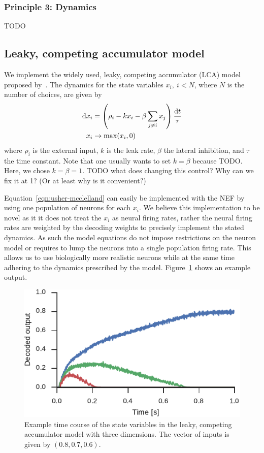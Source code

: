 \documentclass[10pt,letterpaper]{article}
\begin{document}
\subsubsection{Principle 3: Dynamics}
TODO

\subsection{Leaky, competing accumulator model}
We implement the widely used, leaky, competing accumulator (LCA) model proposed 
by~.  The dynamics for the state variables $x_i,\ i < N$, where 
$N$ is the number of choices, are given by
\begin{equation}\label{eqn:usher-mcclelland}
    \begin{split}
        \dif x_i &= \left(\rho_i - kx_i - \beta \sum_{j \neq i} x_j\right) 
        \frac{\dif t}{\tau} \\
    x_i &\rightarrow \max(x_i, 0)
    \end{split}
\end{equation}
where $\rho_i$ is the external input, $k$ is the leak rate, $\beta$ the lateral 
inhibition, and $\tau$ the time constant. Note that one usually wants to set $k 
= \beta$ because TODO\@. Here, we chose $k = \beta = 1$. TODO what does changing 
this control? Why can we fix it at 1? (Or at least why is it convenient?)

Equation~\ref{eqn:usher-mcclelland} can easily be implemented with the NEF by 
using one population of neurons for each $x_i$.  We believe this implementation 
to be novel as it it does not treat the $x_i$ as neural firing rates, rather the 
neural firing rates are weighted by the decoding weights to precisely implement 
the stated dynamics. As such the model equations do not impose restrictions on 
the neuron model or requires to lump the neurons into a single population firing 
rate. This allows us to use biologically more realistic neurons while at the 
same time adhering to the dynamics prescribed by the model.  
Figure~\ref{fig:usher-mcclelland} shows an example output.
\begin{figure}
    \centering
    \includegraphics{figures/usher-mcclelland}
    \caption{Example time course of the state variables in the leaky, competing 
        accumulator model with three dimensions. The vector of inputs is given 
        by $(0.8, 0.7, 0.6)$.}\label{fig:usher-mcclelland}
\end{figure}
\end{document}
